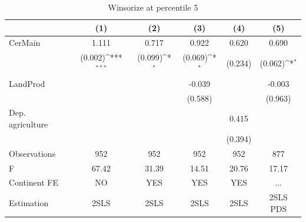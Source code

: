 \documentclass[12pt,a4paper]{article}
\begin{document}
\begin{table}[htbp]\centering
\def\sym#1{\ifmmode^{#1}\else\(^{#1}\)\fi}
\caption{Winsorize at percentile 5}
\begin{tabular}{l*{5}{c}}
\hline\hline
                &\multicolumn{1}{c}{(1)}         &\multicolumn{1}{c}{(2)}         &\multicolumn{1}{c}{(3)}         &\multicolumn{1}{c}{(4)}         &\multicolumn{1}{c}{(5)}         \\
\hline
CerMain         &    1.111         &    0.717         &    0.922         &    0.620         &    0.690         \\
                &  (0.002)\sym{***}&  (0.099)\sym{*}  &  (0.069)\sym{*}  &  (0.234)         &  (0.062)\sym{*}  \\
LandProd        &                  &                  &   -0.039         &                  &   -0.003         \\
                &                  &                  &  (0.588)         &                  &  (0.963)         \\
Dep. agriculture&                  &                  &                  &    0.415         &                  \\
                &                  &                  &                  &  (0.394)         &                  \\
\hline
Observations    &      952         &      952         &      952         &      952         &      877         \\
F               &    67.42         &    31.39         &    14.51         &    20.76         &    17.17         \\
Continent FE    &       NO         &      YES         &      YES         &      YES         &      ...         \\
Estimation      &     2SLS         &     2SLS         &     2SLS         &     2SLS         & 2SLS PDS         \\
\hline\hline
\end{tabular}
\end{table}
\end{document}
